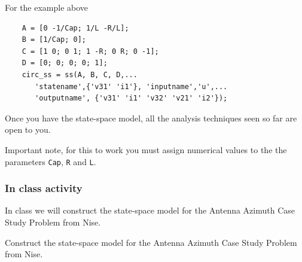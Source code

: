 \begin{slide}
	For the example above
	\begin{verbatim}
	A = [0 -1/Cap; 1/L -R/L];
	B = [1/Cap; 0];
	C = [1 0; 0 1; 1 -R; 0 R; 0 -1];
	D = [0; 0; 0; 0; 1];
	circ_ss = ss(A, B, C, D,...
	   'statename',{'v31' 'i1'}, 'inputname','u',...
	   'outputname', {'v31' 'i1' 'v32' 'v21' 'i2'});
	\end{verbatim}
	Once you have the state-space model, all the analysis techniques seen so far are open to you.
\end{slide}

Important note, for this to work you must assign numerical values to the the parameters \texttt{Cap}, \texttt{R} and \texttt{L}.

\subsubsection*{In class activity}

In class we will construct the state-space model for the Antenna Azimuth Case Study Problem from Nise.
\ifslidesonly
\begin{slide}
Construct the state-space model for the Antenna Azimuth Case Study Problem from Nise.
\end{slide}
\fi 


\endinput

